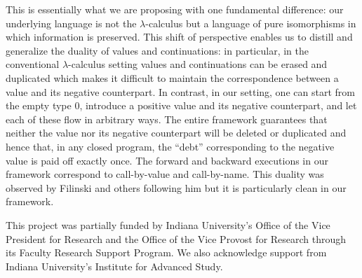 \documentclass[preprint]{sigplanconf}
\begin{document}
This is essentially what we are proposing with one fundamental difference:
our underlying language is not the $\lambda$-calculus but a language of pure
isomorphisms in which information is preserved. This shift of perspective
enables us to distill and generalize the duality of values and continuations:
in particular, in the conventional $\lambda$-calculus setting values and
continuations can be erased and duplicated which makes it difficult to
maintain the correspondence between a value and its negative counterpart. In
contrast, in our setting, one can start from the empty type $0$, introduce a
positive value and its negative counterpart, and let each of these flow in
arbitrary ways. The entire framework guarantees that neither the value nor
its negative counterpart will be deleted or duplicated and hence that, in any
closed program, the ``debt'' corresponding to the negative value is paid off
exactly once. The forward and backward executions in our framework correspond
to call-by-value and call-by-name. This duality was observed by Filinski and
others following him but it is particularly clean in our framework.


\acks This project was partially funded by Indiana University's Office
of the Vice President for Research and the Office of the Vice Provost
for Research through its Faculty Research Support Program.  We also
acknowledge support from Indiana University's Institute for Advanced
Study.

\begin{small}


\end{small}
\end{document}
